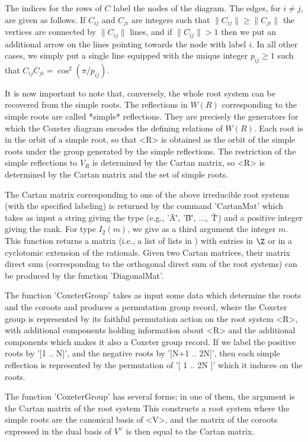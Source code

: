 The  indices for the rows of $C$ label the nodes of the diagram. The edges,
for  $i \ne j$, are given as follows. If $C_{ij}$ and $C_{ji}$ are integers
such  that  $\|C_{ij}\|  \ge  \|C_{ji}\|$  the  vertices  are  connected by
$\|C_{ij}\|$  lines, and if $\|C_{ij}\|>1$ then  we put an additional arrow
on  the lines pointing towards the node with label $i$. In all other cases,
we simply put a single line equipped with the unique integer $p_{ij} \ge 1$
such that $C_{ij}C_{ji}=\cos^2 (\pi/p_{ij})$.

It  is now important to note that, conversely, the whole root system can be
recovered from the simple roots. The reflections in $W(R)$ corresponding to
the  simple roots are  called *simple* reflections.  They are precisely the
generators  for which the Coxeter diagram encodes the defining relations of
$W(R)$. Each root is in the orbit of a simple root, so that <R> is obtained
as  the orbit of the  simple roots under the  group generated by the simple
reflections.  The  restriction  of  the  simple  reflections  to  $V_R$  is
determined  by the Cartan matrix, so <R> is determined by the Cartan matrix
and the set of simple roots.

The  Cartan  matrix  corresponding  to  one  of  the above irreducible root
systems   (with  the  specified  labeling)   is  returned  by  the  command
'CartanMat'  which takes as input a  string giving the type (e.g., '\"A\"',
'\"B\"', $\dots$, '\"I\"') and a positive integer giving the rank. For type
$I_2(m)$,  we  give  as  a  third  argument  the integer $m$. This function
returns  a matrix (i.e., a list of lists in {\GAP}) with entries in $\Z$ or
in  a cyclotomic  extension of  the rationals.  Given two  Cartan matrices,
their  matrix direct sum (corresponding to the orthogonal direct sum of the
root systems) can be produced by the function 'DiagonalMat'.

The  function 'CoxeterGroup' takes  as input some  data which determine the
roots and the coroots and produces a {\GAP} permutation group record, where
the  Coxeter group is represented by its faithful permutation action on the
root  system <R>, with additional  components holding information about <R>
and  the additional components which makes  it also a Coxeter group record.
If  we label the  positive roots by  '[1 .. N]',  and the negative roots by
'[N+1  ..  2\*N]',  then  each  simple  reflection  is  represented  by the
permutation of '[ 1 .. 2\*N ]' which it induces on the roots.


The function 'CoxeterGroup' has several forms; in one of them, the argument
is the Cartan matrix of the root system This constructs a root system where
the  simple roots  are the  canonical basis  of <V>,  and the matrix of the
coroots expressed in the dual basis of $V^\vee$ is then equal to the Cartan
matrix.

